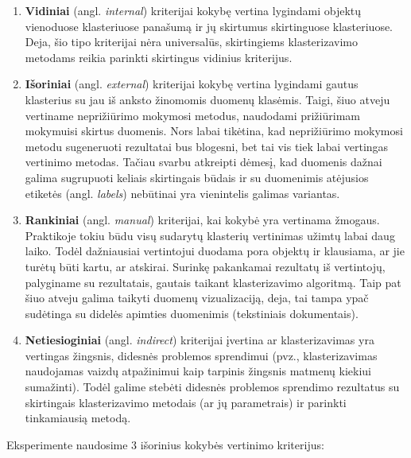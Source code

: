 \documentclass{VUMIFInfBakalaurinis}
\begin{document}
\begin{enumerate}
\def\labelenumi{\arabic{enumi}.}
\item
  \textbf{Vidiniai} (angl. \emph{internal}) kriterijai kokybę vertina
  lygindami objektų vienoduose klasteriuose panašumą ir jų skirtumus
  skirtinguose klasteriuose. Deja, šio tipo kriterijai nėra universalūs,
  skirtingiems klasterizavimo metodams reikia parinkti skirtingus
  vidinius kriterijus.
\item
  \textbf{Išoriniai} (angl. \emph{external}) kriterijai kokybę vertina
  lygindami gautus klasterius su jau iš anksto žinomomis duomenų
  klasėmis. Taigi, šiuo atveju vertiname neprižiūrimo mokymosi metodus,
  naudodami prižiūrimam mokymuisi skirtus duomenis. Nors labai tikėtina,
  kad neprižiūrimo mokymosi metodu sugeneruoti rezultatai bus blogesni,
  bet tai vis tiek labai vertingas vertinimo metodas. Tačiau svarbu
  atkreipti dėmesį, kad duomenis dažnai galima sugrupuoti keliais
  skirtingais būdais ir su duomenimis atėjusios etiketės (angl.
  \emph{labels}) nebūtinai yra vienintelis galimas variantas.
\item
  \textbf{Rankiniai} (angl. \emph{manual}) kriterijai, kai kokybė yra
  vertinama žmogaus. Praktikoje tokiu būdu visų sudarytų klasterių
  vertinimas užimtų labai daug laiko. Todėl dažniausiai vertintojui
  duodama pora objektų ir klausiama, ar jie turėtų būti kartu, ar
  atskirai. Surinkę pakankamai rezultatų iš vertintojų, palyginame su
  rezultatais, gautais taikant klasterizavimo algoritmą. Taip pat šiuo
  atveju galima taikyti duomenų vizualizaciją, deja, tai tampa ypač
  sudėtinga su didelės apimties duomenimis (tekstiniais dokumentais).
\item
  \textbf{Netiesioginiai} (angl. \emph{indirect}) kriterijai įvertina ar
  klasterizavimas yra vertingas žingsnis, didesnės problemos sprendimui
  (pvz., klasterizavimas naudojamas vaizdų atpažinimui kaip tarpinis
  žingsnis matmenų kiekiui sumažinti). Todėl galime stebėti didesnės
  problemos sprendimo rezultatus su skirtingais klasterizavimo metodais
  (ar jų parametrais) ir parinkti tinkamiausią metodą.
\end{enumerate}

Eksperimente naudosime 3 išorinius kokybės vertinimo kriterijus:
\end{document}
